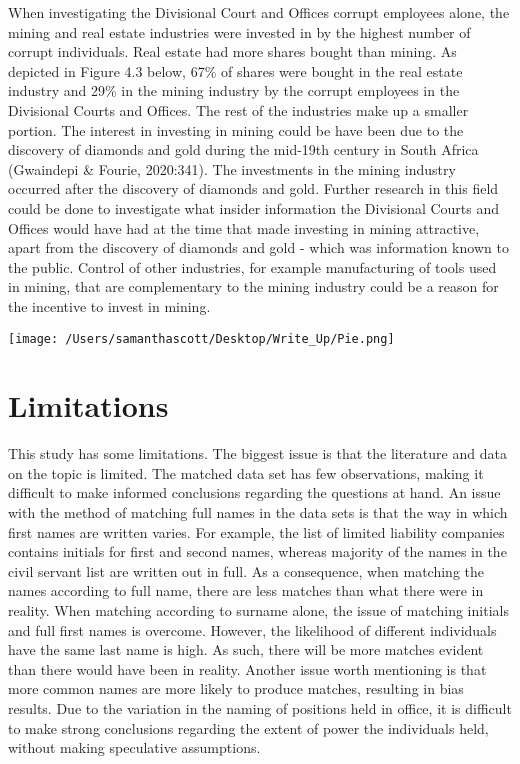 \documentclass[12pt,preprint, authoryear]{elsarticle}
\let\origfigure\figure
\let\endorigfigure\endfigure
\renewenvironment{figure}[1][2] {
    \expandafter\origfigure\expandafter[H]
} {
    \endorigfigure
}
\numberwithin{equation}{section}
\numberwithin{figure}{section}
\numberwithin{table}{section}
\begin{document}
When investigating the Divisional Court and Offices corrupt employees
alone, the mining and real estate industries were invested in by the
highest number of corrupt individuals. Real estate had more shares
bought than mining. As depicted in Figure 4.3 below, 67\% of shares were
bought in the real estate industry and 29\% in the mining industry by
the corrupt employees in the Divisional Courts and Offices. The rest of
the industries make up a smaller portion. The interest in investing in
mining could be have been due to the discovery of diamonds and gold
during the mid-19th century in South Africa (Gwaindepi \& Fourie,
2020:341). The investments in the mining industry occurred after the
discovery of diamonds and gold. Further research in this field could be
done to investigate what insider information the Divisional Courts and
Offices would have had at the time that made investing in mining
attractive, apart from the discovery of diamonds and gold - which was
information known to the public. Control of other industries, for
example manufacturing of tools used in mining, that are complementary to
the mining industry could be a reason for the incentive to invest in
mining.

\begin{figure}
\centering
\texttt{[image: /Users/samanthascott/Desktop/Write\_Up/Pie.png]}
\caption{Number of Shares per Industry, According to Divisional Courts
and Offices}
\end{figure}

\hypertarget{limitations}{%
\section{Limitations}\label{limitations}}

This study has some limitations. The biggest issue is that the
literature and data on the topic is limited. The matched data set has
few observations, making it difficult to make informed conclusions
regarding the questions at hand. An issue with the method of matching
full names in the data sets is that the way in which first names are
written varies. For example, the list of limited liability companies
contains initials for first and second names, whereas majority of the
names in the civil servant list are written out in full. As a
consequence, when matching the names according to full name, there are
less matches than what there were in reality. When matching according to
surname alone, the issue of matching initials and full first names is
overcome. However, the likelihood of different individuals have the same
last name is high. As such, there will be more matches evident than
there would have been in reality. Another issue worth mentioning is that
more common names are more likely to produce matches, resulting in bias
results. Due to the variation in the naming of positions held in office,
it is difficult to make strong conclusions regarding the extent of power
the individuals held, without making speculative assumptions.
\end{document}
